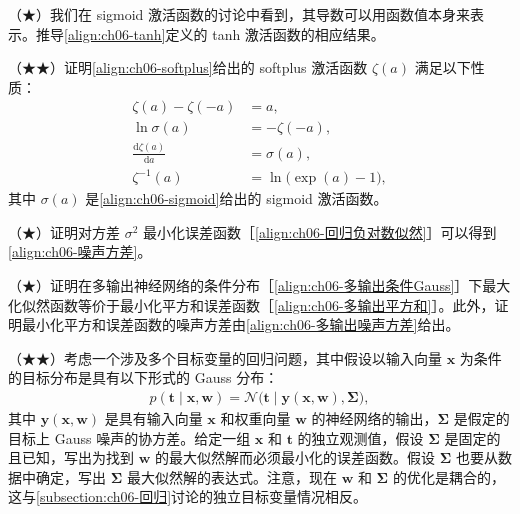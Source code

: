\documentclass[../../main.tex]{subfiles}
\begin{document}
\begin{exercise}\label{exercise:ch06-06}
（★）我们在 sigmoid 激活函数的讨论中看到，其导数可以用函数值本身来表示。推导\eqref{align:ch06-tanh}定义的 tanh 激活函数的相应结果。
\end{exercise}

\begin{exercise}\label{exercise:ch06-07}
（★★）证明\eqref{align:ch06-softplus}给出的 softplus 激活函数 $\zeta(a)$ 满足以下性质：
\begin{align}
\zeta(a)-\zeta(-a)&=a,
\label{align:ch06-softplus奇}
\\
\ln\sigma(a)&=-\zeta(-a),
\label{align:ch06-softplus对数}
\\
\frac{\mathrm{d}\zeta(a)}{\mathrm{d}a}&=\sigma(a),
\label{align:ch06-softplus导数}
\\
\zeta^{-1}(a)&=\ln\bigl(\exp(a)-1\bigr),
\label{align:ch06-softplus逆}
\end{align}
其中 $\sigma(a)$ 是\eqref{align:ch06-sigmoid}给出的 sigmoid 激活函数。
\end{exercise}

\begin{exercise}\label{exercise:ch06-08}
（★）证明对方差 $\sigma^{2}$ 最小化误差函数［\eqref{align:ch06-回归负对数似然}］可以得到\eqref{align:ch06-噪声方差}。
\end{exercise}

\begin{exercise}\label{exercise:ch06-09}
（★）证明在多输出神经网络的条件分布［\eqref{align:ch06-多输出条件Gauss}］下最大化似然函数等价于最小化平方和误差函数［\eqref{align:ch06-多输出平方和}］。此外，证明最小化平方和误差函数的噪声方差由\eqref{align:ch06-多输出噪声方差}给出。
\end{exercise}

\begin{exercise}\label{exercise:ch06-10}
（★★）考虑一个涉及多个目标变量的回归问题，其中假设以输入向量 $\boldsymbol{x}$ 为条件的目标分布是具有以下形式的 Gauss 分布：
\begin{align}
p(\boldsymbol{t}\mid\boldsymbol{x},\boldsymbol{w})=\mathcal{N}\bigl(\boldsymbol{t}\mid\boldsymbol{y}(\boldsymbol{x},\boldsymbol{w}),\boldsymbol{\Sigma}\bigr),
\label{align:ch06-一般协方差Gauss}
\end{align}
其中 $\boldsymbol{y}(\boldsymbol{x},\boldsymbol{w})$ 是具有输入向量 $\boldsymbol{x}$ 和权重向量 $\boldsymbol{w}$ 的神经网络的输出，$\boldsymbol{\Sigma}$ 是假定的目标上 Gauss 噪声的协方差。给定一组 $\boldsymbol{x}$ 和 $\boldsymbol{t}$ 的独立观测值，假设 $\boldsymbol{\Sigma}$ 是固定的且已知，写出为找到 $\boldsymbol{w}$ 的最大似然解而必须最小化的误差函数。假设 $\boldsymbol{\Sigma}$ 也要从数据中确定，写出 $\boldsymbol{\Sigma}$ 最大似然解的表达式。注意，现在 $\boldsymbol{w}$ 和 $\boldsymbol{\Sigma}$ 的优化是耦合的，这与\cref{subsection:ch06-回归}讨论的独立目标变量情况相反。
\end{exercise}
\end{document}
